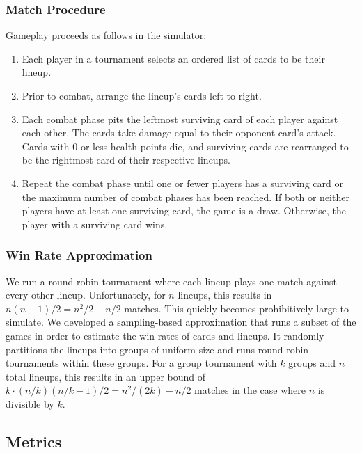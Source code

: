 \documentclass[letterpaper]{article} %
\begin{document}
\subsubsection{Match Procedure} \label{sec:game}

Gameplay proceeds as follows in the simulator:

\begin{enumerate}
	\item Each player in a tournament selects an ordered list
	of cards to be their lineup.
	\item Prior to combat, arrange the lineup's cards left-to-right.
	\item Each combat phase pits the leftmost surviving card
	of each player against each other. The cards take damage equal to %
        their opponent card's attack.
	Cards with %
        0 or less health points die, and surviving cards
	are rearranged to be the rightmost card of their respective lineups.
	\item Repeat the combat phase until one or fewer players has a surviving card
	or the maximum number of combat phases has been reached.
	If both or neither players have at least one surviving card, the game is a draw.
	Otherwise, the player with a surviving card wins.
\end{enumerate}

\subsubsection{Win Rate Approximation} \label{sec:tourney}

We run a round-robin tournament where each lineup plays one match against every other lineup.
Unfortunately, for $n$ lineups, this results in $n(n-1)/2 = n^2/2 - n/2$ matches. This quickly becomes prohibitively large to simulate. We developed a sampling-based approximation that runs a subset of the games in order to estimate the win rates of cards and lineups. It
randomly partitions the lineups into groups of uniform size and runs round-robin tournaments within these groups.
For a group tournament with $k$ groups and $n$ total lineups, this results in an upper bound of $k \cdot (n/k)(n/k - 1)/2 = n^2/(2k) - n/2$ matches in the case where 
$n$ is divisible by $k$.

\subsection{Metrics} \label{sec:metrics}
\end{document}
